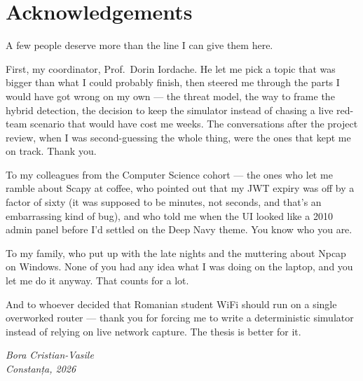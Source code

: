\chapter*{Acknowledgements}
\thispagestyle{plain}

A few people deserve more than the line I can give them here.

First, my coordinator, Prof.\ Dorin Iordache. He let me pick a topic
that was bigger than what I could probably finish, then steered me
through the parts I would have got wrong on my own --- the threat
model, the way to frame the hybrid detection, the decision to keep
the simulator instead of chasing a live red-team scenario that would
have cost me weeks. The conversations after the project review,
when I was second-guessing the whole thing, were the ones that kept
me on track. Thank you.

To my colleagues from the Computer Science cohort --- the ones who
let me ramble about Scapy at coffee, who pointed out that my JWT
expiry was off by a factor of sixty (it was supposed to be minutes,
not seconds, and that's an embarrassing kind of bug), and who told me
when the UI looked like a 2010 admin panel before I'd settled on the
Deep Navy theme. You know who you are.

To my family, who put up with the late nights and the muttering
about Npcap on Windows. None of you had any idea what I was doing
on the laptop, and you let me do it anyway. That counts for a lot.

And to whoever decided that Romanian student WiFi should run on a
single overworked router --- thank you for forcing me to write a
deterministic simulator instead of relying on live network capture.
The thesis is better for it.

\vspace{1cm}
\hfill\textit{Bora Cristian-Vasile}\\
\null\hfill\textit{Constanța, 2026}
